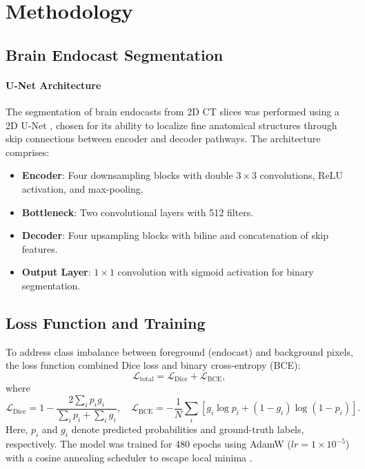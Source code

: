 \chapter{Methodology}


\section{Brain Endocast Segmentation}  
\label{subsec:segmentation}  

\subsubsection{U-Net Architecture}  
The segmentation of brain endocasts from 2D CT slices was performed using a 2D U-Net \cite{Ronneberger_2015}, chosen for its ability to localize fine anatomical structures through skip connections between encoder and decoder pathways. The architecture comprises:  
\begin{itemize}  
    \item \textbf{Encoder}: Four downsampling blocks with double \(3 \times 3\) convolutions, ReLU activation, and max-pooling.  
    \item \textbf{Bottleneck}: Two convolutional layers with 512 filters.  
    \item \textbf{Decoder}: Four upsampling blocks with biline and concatenation of skip features.  
    \item \textbf{Output Layer}: \(1 \times 1\) convolution with sigmoid activation for binary segmentation.  
\end{itemize}  

\section{Loss Function and Training}  
To address class imbalance between foreground (endocast) and background pixels, the loss function combined Dice loss and binary cross-entropy (BCE):  
\begin{equation}  
    \mathcal{L}_{\text{total}} = \mathcal{L}_{\text{Dice}} + \mathcal{L}_{\text{BCE}},  
\end{equation}  
where  
\[  
\mathcal{L}_{\text{Dice}} = 1 - \frac{2 \sum_{i} p_i g_i}{\sum_{i} p_i + \sum_{i} g_i}, \quad  
\mathcal{L}_{\text{BCE}} = -\frac{1}{N} \sum_{i} \left[ g_i \log p_i + (1 - g_i) \log (1 - p_i) \right].  
\]  
Here, \(p_i\) and \(g_i\) denote predicted probabilities and ground-truth labels, respectively. The model was trained for 480 epochs using AdamW (\(lr = 1 \times 10^{-5}\)) with a cosine annealing scheduler to escape local minima \cite{Lundberg2017}.  


